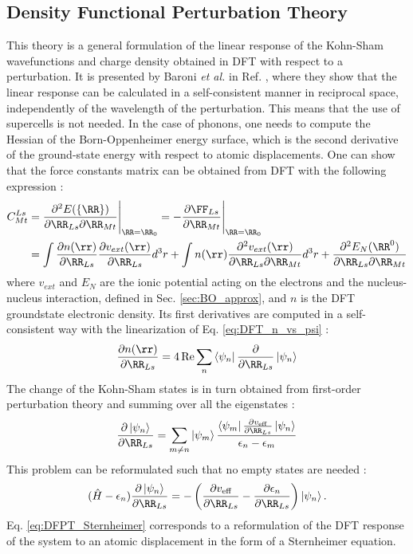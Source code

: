 \subsection{Density Functional Perturbation Theory} \label{sec:DFPT}
This theory is a general formulation of the linear response of the Kohn-Sham wavefunctions and charge density obtained in \acrshort{DFT} with respect to a perturbation. It is presented by Baroni \textit{et al.} in Ref. \cite{baroni2001phonons}, where they show that the linear response can be calculated in a self-consistent manner in reciprocal space, independently of the wavelength of the perturbation. This means that the use of supercells is not needed. In the case of phonons, one needs to compute the Hessian of the Born-Oppenheimer energy surface, which is the second derivative of the ground-state energy with respect to atomic displacements. One can show that the force constants matrix can be obtained from \acrshort{DFT} with the following expression \cite{gonze1997dynamical} :
\begin{align}
\begin{split}
	C^{Ls}_{Mt} &= \frac{\partial^2 E(\{\RR\})}{\partial\RR_{Ls} \partial \RR_{Mt}} \Biggr|_{\RR=\RR_0} = - \frac{\partial \FF_{Ls}}{\partial \RR_{Mt}} \Biggr|_{\RR=\RR_0} \\
	&= \int \frac{\partial n(\rr)}{\partial \RR_{Ls}} \frac{\partial v_{ext}(\rr)}{\partial \RR_{Ls}} d^3r + \int n(\rr) \frac{\partial^2 v_{ext}(\rr)}{\partial \RR_{Ls} \partial \RR_{Mt}} d^3r + \frac{\partial^2 E_N(\RR^0) }{\partial \RR_{Ls} \partial \RR_{Mt}}
\end{split}
\end{align}
where $v_{ext}$ and $E_N$ are the ionic potential acting on the electrons and the nucleus-nucleus interaction, defined in Sec. \ref{sec:BO_approx}, and $n$ is the \acrshort{DFT} groundstate electronic density. Its first derivatives are computed in a self-consistent way with the linearization of Eq. \eqref{eq:DFT_n_vs_psi} :
\begin{equation}
	\frac{\partial n(\rr)}{\partial \RR_{Ls}} = 4\Re \sum_n \bra{\psi_n} \frac{\partial}{\partial \RR_{Ls}} \ket{\psi_n}
\end{equation}
The change of the Kohn-Sham states is in turn obtained from first-order perturbation theory and summing over all the eigenstates :
\begin{equation}
	\frac{\partial\ket{\psi_n}}{\partial \RR_{Ls}} = \sum_{m\neq n} \ket{\psi_m} \frac{\bra{\psi_m} \tfrac{\partial v_{\text{eff}}}{\partial\RR_{Ls}}\ket{\psi_n}}{\epsilon_n - \epsilon_m}
\end{equation}
This problem can be reformulated such that no empty states are needed :
\begin{equation}
	(\hat{H} - \epsilon_n) \frac{\partial\ket{\psi_n}}{\partial \RR_{Ls}} = - \left(\frac{\partial v_{\text{eff}}}{\partial\RR_{Ls}} - \frac{\partial \epsilon_n}{\partial\RR_{Ls}}  \right) \ket{\psi_n}. \label{eq:DFPT_Sternheimer}
\end{equation}
Eq. \eqref{eq:DFPT_Sternheimer} corresponds to a reformulation of the \acrshort{DFT} response of the system to an atomic displacement in the form of a  Sternheimer equation.

